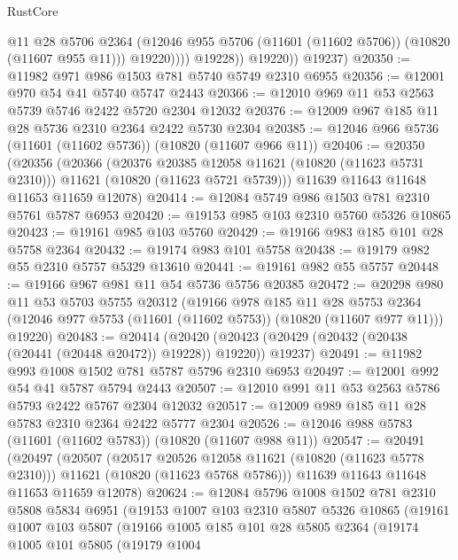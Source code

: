 \begin{lexlean}{RustCore}
\begin{coremodule}
                      @11
                      @28
                      @5706
                      @2364
                      (@12046 @955 @5706 (@11601 (@11602 @5706)) (@10820 (@11607 @955 @11)))
                      @19220))))
              @19228))
          @19220))
      @19237)
@20350 := @11982 @971 @986 @1503 @781 @5740 @5749 @2310 @6955
@20356 := @12001 @970 @54 @41 @5740 @5747 @2443
@20366 := @12010 @969 @11 @53 @2563 @5739 @5746 @2422 @5720 @2304 @12032
@20376 := @12009 @967 @185 @11 @28 @5736 @2310 @2364 @2422 @5730 @2304
@20385 := @12046 @966 @5736 (@11601 (@11602 @5736)) (@10820 (@11607 @966 @11))
@20406 := @20350
    (@20356
      (@20366
        (@20376 @20385 @12058 @11621 (@10820 (@11623 @5731 @2310)))
        @11621
        (@10820 (@11623 @5721 @5739)))
      @11639
      @11643
      @11648
      @11653
      @11659
      @12078)
@20414 := @12084 @5749 @986 @1503 @781 @2310 @5761 @5787 @6953
@20420 := @19153 @985 @103 @2310 @5760 @5326 @10865
@20423 := @19161 @985 @103 @5760
@20429 := @19166 @983 @185 @101 @28 @5758 @2364
@20432 := @19174 @983 @101 @5758
@20438 := @19179 @982 @55 @2310 @5757 @5329 @13610
@20441 := @19161 @982 @55 @5757
@20448 := @19166 @967 @981 @11 @54 @5736 @5756 @20385
@20472 := @20298
    @980
    @11
    @53
    @5703
    @5755
    @20312
    (@19166
      @978
      @185
      @11
      @28
      @5753
      @2364
      (@12046 @977 @5753 (@11601 (@11602 @5753)) (@10820 (@11607 @977 @11)))
      @19220)
@20483 := @20414
    (@20420 (@20423 (@20429 (@20432 (@20438 (@20441 (@20448 @20472)) @19228)) @19220)) @19237)
@20491 := @11982 @993 @1008 @1502 @781 @5787 @5796 @2310 @6953
@20497 := @12001 @992 @54 @41 @5787 @5794 @2443
@20507 := @12010 @991 @11 @53 @2563 @5786 @5793 @2422 @5767 @2304 @12032
@20517 := @12009 @989 @185 @11 @28 @5783 @2310 @2364 @2422 @5777 @2304
@20526 := @12046 @988 @5783 (@11601 (@11602 @5783)) (@10820 (@11607 @988 @11))
@20547 := @20491
    (@20497
      (@20507
        (@20517 @20526 @12058 @11621 (@10820 (@11623 @5778 @2310)))
        @11621
        (@10820 (@11623 @5768 @5786)))
      @11639
      @11643
      @11648
      @11653
      @11659
      @12078)
@20624 := @12084
    @5796
    @1008
    @1502
    @781
    @2310
    @5808
    @5834
    @6951
    (@19153
      @1007
      @103
      @2310
      @5807
      @5326
      @10865
      (@19161
        @1007
        @103
        @5807
        (@19166
          @1005
          @185
          @101
          @28
          @5805
          @2364
          (@19174
            @1005
            @101
            @5805
            (@19179
              @1004

\end{coremodule}
\end{lexlean}
